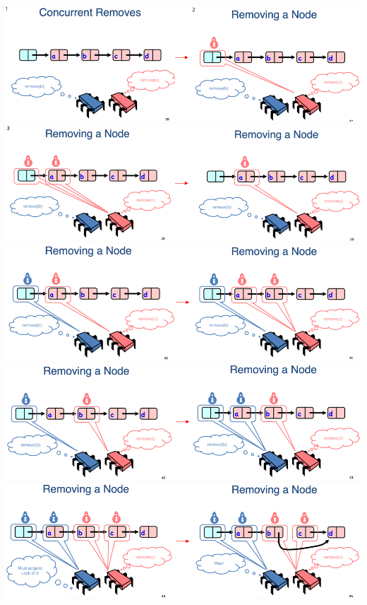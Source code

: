 \documentclass[12pt]{article}
\begin{document}
\begin{enumerate}[1.]
\begin{enumerate}[a)]
\begin{itemize}
\begin{itemize}
                \begin{center}
                \includegraphics[width=\linewidth]{../images/midterm_3_solution_3.png}
                \includegraphics[width=\linewidth]{../images/midterm_3_solution_4.png}
                \includegraphics[width=\linewidth]{../images/midterm_3_solution_5.png}
                \includegraphics[width=\linewidth]{../images/midterm_3_solution_6.png}
                \includegraphics[width=\linewidth]{../images/midterm_3_solution_7.png}

\end{center}
\end{itemize}
\end{itemize}
\end{enumerate}
\end{enumerate}
\end{document}
